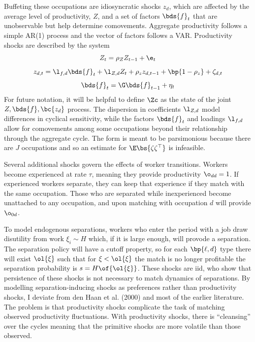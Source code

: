 \documentclass[12pt]{article}
\theoremstyle{definition}
\begin{document}
Buffeting these occupations are idiosyncratic shocks $z_d$, which are affected by the average level of productivity, $Z$, and a set of factors $\bds{f}_t$ that are unobservable but help determine comovements. Aggregate productivity follows a simple AR(1) process and the vector of  factors follows a VAR. Productivity shocks are described by the system
\begin{equation}
    \label{wiczerLongTermUnemploymentAttached2015_eq1}
    Z_t = \rho_Z Z_{t-1} + \e_t
\end{equation}
\begin{equation}
    \label{wiczerLongTermUnemploymentAttached2015_eq2}
    z_{d, t} = \l_{f, d} \bds{f}_t + \l_{Z, d} Z_t + \rho_z z_{d, t-1} + \bp{1 - \rho_z} + \zeta_{d, t}
\end{equation}
\begin{equation}
    \label{wiczerLongTermUnemploymentAttached2015_eq3}
    \bds{f}_t = \G \bds{f}_{t-1} + \eta_t
\end{equation}
For future notation, it will be helpful to define $\Zc$ as the state of the joint $Z, \bds{f}, \bc{z_d}$ process. The dispersion in coefficients $\l_{Z, d}$ model differences in cyclical sensitivity, while the factors $\bds{f}_t$ and loadings $\l_{f, d}$ allow for comovements among some occupations beyond their relationship through the aggregate cycle. The form is meant to be parsimonious because there are $J$ occupations and so an estimate for $\E\bs{\zeta \zeta^{\top}}$ is infeasible. 

Several additional shocks govern the effects of worker transitions. Workers become experienced at rate $\tau$, meaning they provide productivity $\o_{dd}=1$. If experienced workers separate, they can keep that experience if they match with the same occupation. Those who are separated while inexperienced become unattached to any occupation, and upon matching with occupation $d$ will provide $\o_{0d}$.

To model endogenous separations, workers who enter the period with a job draw disutility from work $\xi_i \sim H$ which, if it is large enough, will provode a separation. The separation policy will have a cutoff property, so for each $\bp{\ell, d}$ type there will exist $\ol{\xi}$ such that for $\xi < \ol{\xi}$ the match is no longer profitable the separation probability is $s = H\of{\ol{\xi}}$. These shocks are iid, who show that persistence of these shocks is not necessary to match dynamics of separations. By modelling separation-inducing shocks as preferences rather than productivity shocks, I deviate from den Haan et al. (2000) and most of the earlier literature. The problem is that productivity shocks complicate the task of matching observed productivity fluctuations. With productivity shocks, there is ``cleansing'' over the cycles meaning that the primitive shocks are more volatile than those observed. 
\end{document}

